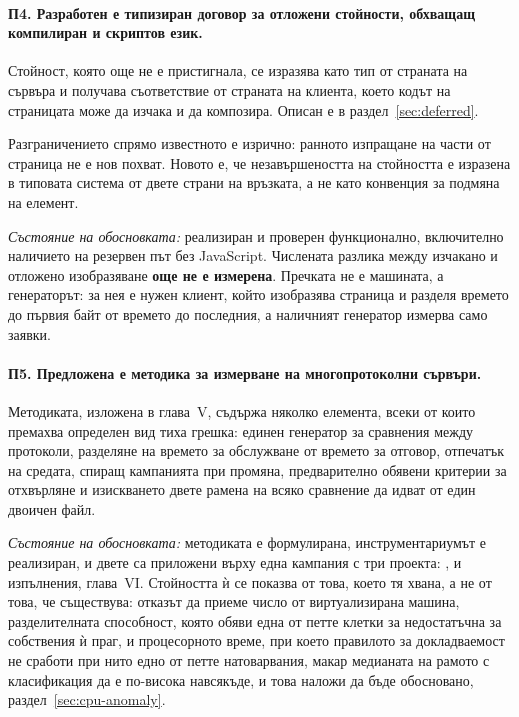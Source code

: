 \paragraph{П4. Разработен е типизиран договор за отложени стойности, обхващащ компилиран и
скриптов език.}
Стойност, която още не е пристигнала, се изразява като тип от страната на сървъра и получава
съответствие от страната на клиента, което кодът на страницата може да изчака и да композира.
Описан е в раздел~\ref{sec:deferred}.

Разграничението спрямо известното е изрично: ранното изпращане на части от страница не е нов
похват. Новото е, че незавършеността на стойността е изразена в типовата система от двете
страни на връзката, а не като конвенция за подмяна на елемент.

\emph{Състояние на обосновката:} реализиран и проверен функционално, включително наличието на
резервен път без JavaScript. Числената разлика между изчакано и отложено изобразяване
\textbf{още не е измерена}. Пречката не е машината, а генераторът: за нея е нужен клиент,
който изобразява страница и разделя времето до първия байт от времето до последния, а
наличният генератор измерва само заявки.

\paragraph{П5. Предложена е методика за измерване на многопротоколни сървъри.}
Методиката, изложена в глава~V, съдържа няколко елемента, всеки от които премахва определен
вид тиха грешка: единен генератор за сравнения между протоколи, разделяне на времето за
обслужване от времето за отговор, отпечатък на средата, спиращ кампанията при промяна,
предварително обявени критерии за отхвърляне и изискването двете рамена на всяко сравнение да
идват от един двоичен файл.

\emph{Състояние на обосновката:} методиката е формулирана, инструментариумът е реализиран, и
двете са приложени върху една кампания с три проекта: ,
 и  изпълнения, глава~VI.
Стойността ѝ се показва от това, което тя хвана, а не от това, че съществува: отказът да
приеме число от виртуализирана машина, разделителната способност, която обяви една от петте
клетки за недостатъчна за собствения ѝ праг, и процесорното време, при което правилото за
докладваемост не сработи при нито едно от петте натоварвания, макар медианата на рамото с
класификация да е по-висока навсякъде, и това наложи да бъде обосновано,
раздел~\ref{sec:cpu-anomaly}.

